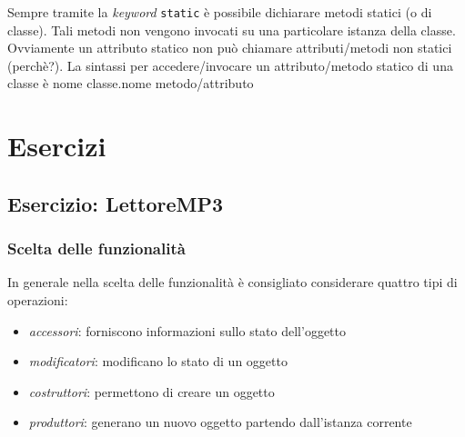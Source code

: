 \documentclass{article}
\begin{document}
Sempre tramite la \textit{keyword} \texttt{static}
è possibile dichiarare metodi statici (o di classe).
Tali metodi non vengono invocati su una particolare
istanza della classe.
Ovviamente un attributo statico non può chiamare
attributi/metodi non statici (perchè?).
La sintassi per accedere/invocare un attributo/metodo statico
di una classe è
nome classe.nome metodo/attributo

\section{Esercizi}


\subsection{Esercizio: LettoreMP3}



\subsubsection{Scelta delle funzionalit\`a}
In generale nella scelta delle funzionalit\`a \`e consigliato considerare quattro tipi di operazioni:
\begin{itemize}
\item \emph{accessori}: forniscono informazioni sullo stato dell'oggetto
\item \emph{modificatori}: modificano lo stato di un oggetto
\item \emph{costruttori}:  permettono di creare un oggetto
\item \emph{produttori}: generano un nuovo oggetto partendo dall'istanza corrente
\end{itemize}
\end{document}
